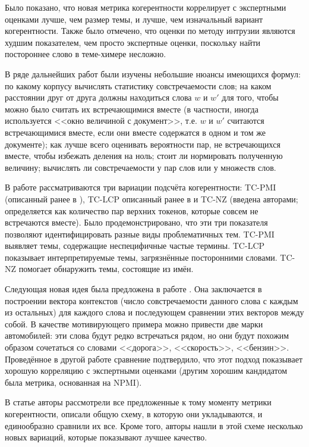 Было показано, что новая метрика когерентности коррелирует с экспертными оценками лучше, чем размер темы, и лучше, чем изначальный вариант когерентности. Также было отмечено, что оценки по методу интрузии являются худшим показателем, чем просто экспертные оценки, поскольку найти постороннее слово в теме-химере несложно.

В ряде дальнейших работ были изучены небольшие нюансы имеющихся формул: по какому корпусу вычислять статистику совстречаемости слов; на каком расстоянии друг от друга должны находиться слова $w$ и $w'$ для того, чтобы можно было считать их встречающимися вместе (в частности, иногда используется <<окно величиной с документ>>, т.е. $w$ и $w'$ считаются встречающимися вместе, если они вместе содержатся в одном и том же документе); как лучше всего оценивать вероятности пар, не встречающихся вместе, чтобы избежать деления на ноль; стоит ли нормировать полученную величину; вычислять ли совстречаемости у пар слов или у множеств слов.

В работе \cite{boydcare} рассматриваются три вариации подсчёта когерентности: TC-PMI (описанный ранее в \cite{newman2010automatic}), TC-LCP описанный ранее в \cite{mimno2011} и TC-NZ (введена авторами; определяется как количество пар верхних токенов, которые совсем не встречаются вместе). Было продемонстрировано, что эти три показателя позволяют идентифицировать разные виды проблематичных тем. TC-PMI выявляет темы, содержащие неспецифичные частые термины. TC-LCP показывает интерпретируемые темы, загрязнённые посторонними словами. TC-NZ помогает обнаружить темы, состоящие из имён.

Следующая новая идея была предложена в работе \cite{aletras2013evaluating}. Она заключается в построении вектора контекстов (число совстречаемости данного слова с каждым из остальных) для каждого слова и последующем сравнении этих векторов между собой. В качестве мотивирующего примера можно привести две марки автомобилей: эти слова будут редко встречаться рядом, но они будут похожим образом сочетаться со словами <<дорога>>, <<скорость>>, <<бензин>>. Проведённое в другой работе \cite{mrtl} сравнение подтвердило, что этот подход показывает хорошую корреляцию с экспертными оценками (другим хорошим кандидатом была метрика, основанная на NPMI).

В статье \cite{roder2015exploring} авторы рассмотрели все предложенные к тому моменту метрики когерентности, описали общую схему, в которую они укладываются, и единообразно сравнили их все. Кроме того, авторы нашли в этой схеме несколько новых вариаций, которые показывают лучшее качество.

